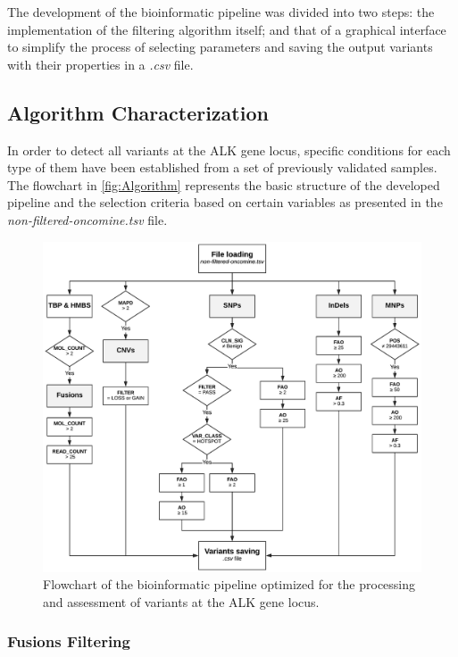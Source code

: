 The development of the bioinformatic pipeline was divided into two steps: the implementation of the filtering algorithm itself; and that of a graphical interface to simplify the process of selecting parameters and saving the output variants with their properties in a \textit{.csv} file.

\subsection{Algorithm Characterization}

In order to detect all variants at the ALK gene locus, specific conditions for each type of them have been established from a set of previously validated samples. The flowchart in \autoref{fig:Algorithm} represents the basic structure of the developed pipeline and the selection criteria based on certain variables as presented in the \textit{non-filtered-oncomine.tsv} file.

\begin{figure}[ht]
    \centering
    \includegraphics[width=\textwidth]{Images/chapter_4/mut_filtering.png}
    \caption{Flowchart of the bioinformatic pipeline optimized for the processing and assessment of variants at the ALK gene locus.}
    \label{fig:Algorithm}
\end{figure}

\subsubsection{Fusions Filtering}


